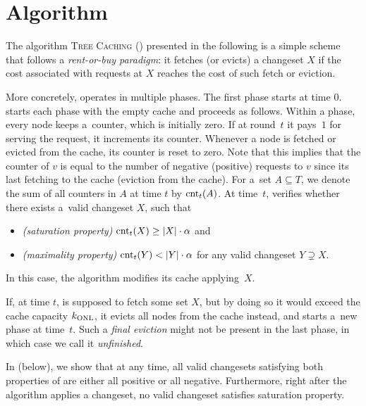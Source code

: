 
\section{Algorithm}\label{sec:algo}

The algorithm \textsc{Tree Caching} (\ALGTC) presented in the following is
a simple scheme that follows a \emph{rent-or-buy paradigm}: it fetches (or evicts)
a changeset $X$ if the cost associated with requests at $X$ reaches the cost of 
such fetch or eviction.

More concretely, \ALGTC operates in multiple phases. The first phase starts at time $0$.
\ALGTC starts each phase with the empty cache and proceeds as follows. Within a
phase, every node keeps a~counter, which is initially zero. If at round~$t$ it
pays~$1$ for serving the request, it increments its counter. Whenever a node
is fetched or evicted from the cache, its counter is reset to zero. Note that
this implies that the counter of $v$ is equal to the number of negative
(positive) requests to $v$ since its last fetching to the cache (eviction from
the cache). For a~set $A \subseteq T$, we denote the sum of all counters in
$A$ at time $t$ by $\textrm{cnt}_t(A)$. At time~$t$, \ALGTC verifies whether
there exists a~valid changeset $X$, such that
\begin{itemize}
\item \emph{(saturation property)} $\textrm{cnt}_t(X) \geq |X| \cdot \alpha$ and
\item \emph{(maximality property)} $\textrm{cnt}_t(Y) < |Y| \cdot \alpha$ for any valid
  changeset $Y \supsetneq X$.
\end{itemize}
In this case, the algorithm modifies its cache applying~$X$. 

If, at time $t$, \ALGTC is supposed to fetch some set $X$, but by doing so it
would exceed the cache capacity $k_\textnormal{ONL}$, it evicts all nodes from the cache
instead, and starts a~new phase at time~$t$. Such a \emph{final eviction}
might not be present in the last phase, in which case we call it
\emph{unfinished}. 


In  (below), we show that at any
time, all valid changesets satisfying both properties of \ALGTC are either all
positive or all negative. Furthermore, right after the algorithm applies a
changeset, no valid changeset satisfies saturation property.

